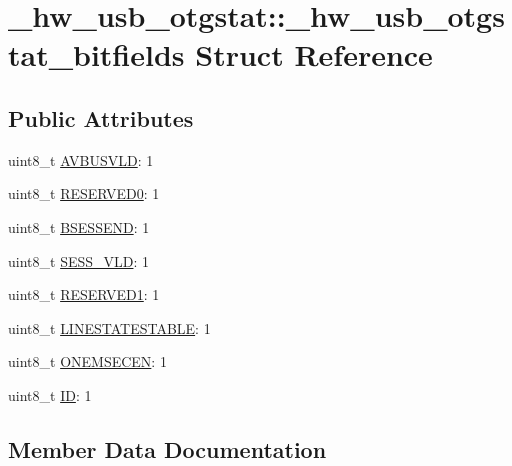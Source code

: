 \hypertarget{struct__hw__usb__otgstat_1_1__hw__usb__otgstat__bitfields}{}\section{\+\_\+hw\+\_\+usb\+\_\+otgstat\+:\+:\+\_\+hw\+\_\+usb\+\_\+otgstat\+\_\+bitfields Struct Reference}
\label{struct__hw__usb__otgstat_1_1__hw__usb__otgstat__bitfields}
\subsection*{Public Attributes}
\begin{DoxyCompactItemize}
\item 
uint8\+\_\+t \hyperlink{struct__hw__usb__otgstat_1_1__hw__usb__otgstat__bitfields_a3f9b4ab6d49a1c0022b0e57bd6547443}{A\+V\+B\+U\+S\+V\+LD}\+: 1
\item 
uint8\+\_\+t \hyperlink{struct__hw__usb__otgstat_1_1__hw__usb__otgstat__bitfields_af8d132d594ca9c90be19b0a054c10c8b}{R\+E\+S\+E\+R\+V\+E\+D0}\+: 1
\item 
uint8\+\_\+t \hyperlink{struct__hw__usb__otgstat_1_1__hw__usb__otgstat__bitfields_a541de9a609f4929a6b444a8e3d03d977}{B\+S\+E\+S\+S\+E\+ND}\+: 1
\item 
uint8\+\_\+t \hyperlink{struct__hw__usb__otgstat_1_1__hw__usb__otgstat__bitfields_a9369ed5ce40cc43d766495c399f39a13}{S\+E\+S\+S\+\_\+\+V\+LD}\+: 1
\item 
uint8\+\_\+t \hyperlink{struct__hw__usb__otgstat_1_1__hw__usb__otgstat__bitfields_ac26a1ec348e13485fe57d127b55af563}{R\+E\+S\+E\+R\+V\+E\+D1}\+: 1
\item 
uint8\+\_\+t \hyperlink{struct__hw__usb__otgstat_1_1__hw__usb__otgstat__bitfields_a1ee6a1919524681e5f51656067cbea15}{L\+I\+N\+E\+S\+T\+A\+T\+E\+S\+T\+A\+B\+LE}\+: 1
\item 
uint8\+\_\+t \hyperlink{struct__hw__usb__otgstat_1_1__hw__usb__otgstat__bitfields_afdc7077eabd2f418f120ed097ee761da}{O\+N\+E\+M\+S\+E\+C\+EN}\+: 1
\item 
uint8\+\_\+t \hyperlink{struct__hw__usb__otgstat_1_1__hw__usb__otgstat__bitfields_af83e643a40228fdf6ea6e2c290e84fcf}{ID}\+: 1
\end{DoxyCompactItemize}


\subsection{Member Data Documentation}
